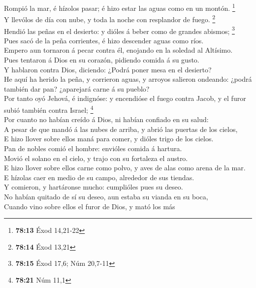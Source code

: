  Rompió la mar, é hízolos pasar; é hizo estar las aguas
como en un montón. \footnote{\textbf{78:13} Éxod 14,21-22}\\
 Y llevólos de día con nube, y toda la noche con
resplandor de fuego. \footnote{\textbf{78:14} Éxod 13,21}\\
 Hendió las peñas en el desierto: y dióles á beber como
de grandes abismos; \footnote{\textbf{78:15} Éxod 17,6; Núm 20,7-11}\\
 Pues sacó de la peña corrientes, é hizo descender aguas
como ríos.\\
 Empero aun tornaron á pecar contra él, enojando en la
soledad al Altísimo.\\
 Pues tentaron á Dios en su corazón, pidiendo comida á su
gusto.\\
 Y hablaron contra Dios, diciendo: ¿Podrá poner mesa en
el desierto?\\
 He aquí ha herido la peña, y corrieron aguas, y arroyos
salieron ondeando: ¿podrá también dar pan? ¿aparejará carne á su
pueblo?\\
 Por tanto oyó Jehová, é indignóse: y encendióse el fuego
contra Jacob, y el furor subió también contra Israel; \footnote{\textbf{78:21}
  Núm 11,1}\\
 Por cuanto no habían creído á Dios, ni habían confiado
en su salud:\\
 A pesar de que mandó á las nubes de arriba, y abrió las
puertas de los cielos,\\
 E hizo llover sobre ellos maná para comer, y dióles
trigo de los cielos.\\
 Pan de nobles comió el hombre: envióles comida á
hartura.\\
 Movió el solano en el cielo, y trajo con su fortaleza el
austro.\\
 E hizo llover sobre ellos carne como polvo, y aves de
alas como arena de la mar.\\
 E hízolas caer en medio de su campo, alrededor de sus
tiendas.\\
 Y comieron, y hartáronse mucho: cumplióles pues su
deseo.\\
 No habían quitado de sí su deseo, aun estaba su vianda
en su boca,\\
 Cuando vino sobre ellos el furor de Dios, y mató los más
